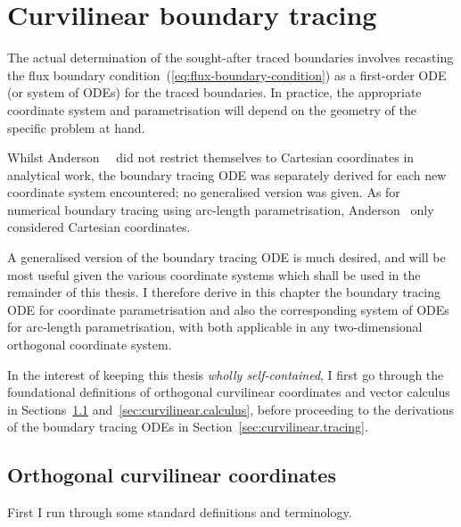 \chapter{Curvilinear boundary tracing}
\label{ch:curvilinear}

The actual determination of the sought-after traced boundaries involves
recasting the flux boundary condition~(\ref{eq:flux-boundary-condition})
as a first-order ODE (or system of ODEs) for the traced boundaries.
In practice, the appropriate coordinate system and parametrisation
will depend on the geometry of the specific problem at hand.

Whilst Anderson~\etal~\cite{
  anderson-2007-boundary-tracing-i-theory,
  anderson-2007-boundary-tracing-ii-applications
}
did not restrict themselves to Cartesian coordinates in analytical work,
the boundary tracing ODE was separately derived
for each new coordinate system encountered;
no generalised version was given.
As for numerical boundary tracing using arc-length parametrisation,
Anderson~\cite{anderson-2002-thesis-boundary-tracing-pdes}
only considered Cartesian coordinates.

A generalised version of the boundary tracing ODE is much desired,
and will be most useful given the various coordinate systems
which shall be used in the remainder of this thesis.
I therefore derive in this chapter
the boundary tracing ODE for coordinate parametrisation
and also the corresponding system of ODEs for arc-length parametrisation,
with both applicable in any two-dimensional orthogonal coordinate system.

In the interest of keeping this thesis \emph{wholly self-contained},
I first go through the foundational definitions of
orthogonal curvilinear coordinates and vector calculus
in Sections~\ref{sec:curvilinear.orthogonal}
and~\ref{sec:curvilinear.calculus},
before proceeding to the derivations of the boundary tracing ODEs
in Section~\ref{sec:curvilinear.tracing}.

\section{Orthogonal curvilinear coordinates}
\label{sec:curvilinear.orthogonal}

First I run through some standard definitions and terminology.

